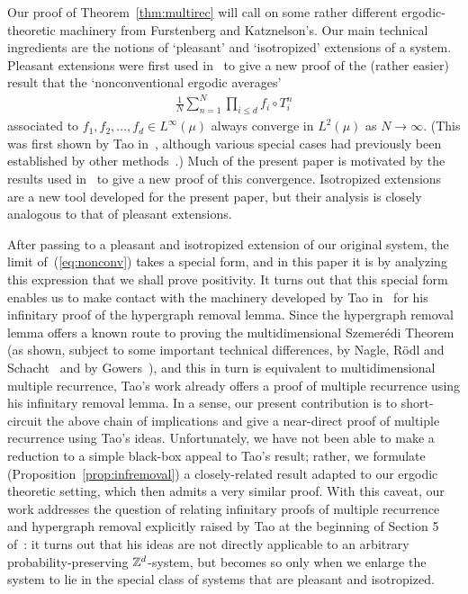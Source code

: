 \documentclass[12pt]{article}
\begin{document}
Our proof of Theorem~\ref{thm:multirec} will call on some rather
different ergodic-theoretic machinery from Furstenberg and
Katznelson's.  Our main technical ingredients are the notions of
`pleasant' and `isotropized' extensions of a system. Pleasant
extensions were first used in~\cite{Aus--nonconv} to give a new
proof of the (rather easier) result that the `nonconventional
ergodic averages'
\begin{eqnarray}\label{eq:nonconv}
\frac{1}{N}\sum_{n=1}^N\prod_{i\leq d}f_i\circ T_i^n
\end{eqnarray}
associated to $f_1,f_2,\ldots,f_d \in L^\infty(\mu)$ always converge
in $L^2(\mu)$ as $N\to\infty$.  (This was first shown by Tao
in~\cite{Tao08(nonconv)}, although various special cases had
previously been established by other
methods~\cite{ConLes88.1,ConLes88.2,Zha96,HosKra01,HosKra05,Zie07,FraKra05}.)
Much of the present paper is motivated by the results used
in~\cite{Aus--nonconv} to give a new proof of this convergence.
Isotropized extensions are a new tool developed for the present
paper, but their analysis is closely analogous to that of pleasant
extensions.

After passing to a pleasant and isotropized extension of our
original system, the limit of~(\ref{eq:nonconv}) takes a special
form, and in this paper it is by analyzing this expression that we
shall prove positivity. It turns out that this special form enables
us to make contact with the machinery developed by Tao
in~\cite{Tao07} for his infinitary proof of the hypergraph removal
lemma.  Since the hypergraph removal lemma offers a known route to
proving the multidimensional Szemer\'edi Theorem (as shown, subject
to some important technical differences, by Nagle, R\"odl and
Schacht~\cite{NagRodSch07} and by Gowers~\cite{Gow??}), and this in
turn is equivalent to multidimensional multiple recurrence, Tao's
work already offers a proof of multiple recurrence using his
infinitary removal lemma. In a sense, our present contribution is to
short-circuit the above chain of implications and give a near-direct
proof of multiple recurrence using Tao's ideas.  Unfortunately, we
have not been able to make a reduction to a simple black-box appeal
to Tao's result; rather, we formulate
(Proposition~\ref{prop:infremoval}) a closely-related result adapted
to our ergodic theoretic setting, which then admits a very similar
proof. With this caveat, our work addresses the question of relating
infinitary proofs of multiple recurrence and hypergraph removal
explicitly raised by Tao at the beginning of Section 5
of~\cite{Tao07}: it turns out that his ideas are not directly
applicable to an arbitrary probability-preserving $\mathbb{Z}^d$-system,
but becomes so only when we enlarge the system to lie in the special
class of systems that are pleasant and isotropized.
\end{document}
